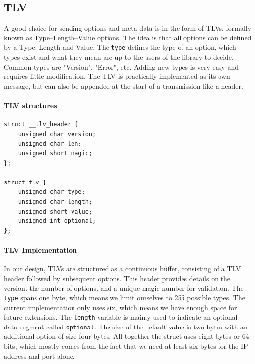 \documentclass[a4paper,english, 11pt]{report}
\begin{document}
\subsection{TLV}
A good choice for sending options and meta-data is in the form of TLVs, formally known as Type–Length–Value options.
The idea is that all options can be defined by a Type, Length and Value. The \verb|type| defines the type of an option, which types exist and what they mean are up to the users of the library to decide. Common types are "Version", "Error", etc. Adding new types is very easy and requires little modification. The TLV is practically implemented as its own message, but can also be appended at the start of a transmission like a header.\\

\noindent\begin{minipage}{\linewidth}
\paragraph{TLV structures}
\begin{verbatim}
struct __tlv_header {
    unsigned char version;
    unsigned char len;
    unsigned short magic;
};

struct tlv {
    unsigned char type;
    unsigned char length;
    unsigned short value;
    unsigned int optional;
};
\end{verbatim}
\end{minipage}

\paragraph{TLV Implementation}
In our design, TLVs are structured as a continuous buffer, consisting of a TLV header followed by subsequent options.  This header provides details on the version, the number of options, and a unique magic number for validation. The \verb|type| spans one byte, which means we limit ourselves to 255 possible types. The current implementation only uses six, which means we have enough space for future extensions. The \verb|length| variable is mainly used to indicate an optional data segment called \verb|optional|. The size of the default value is two bytes with an additional option of size four bytes. All together the struct uses eight bytes or 64 bits, which mostly comes from the fact that we need at least six bytes for the IP address and port alone. 
\end{document}
